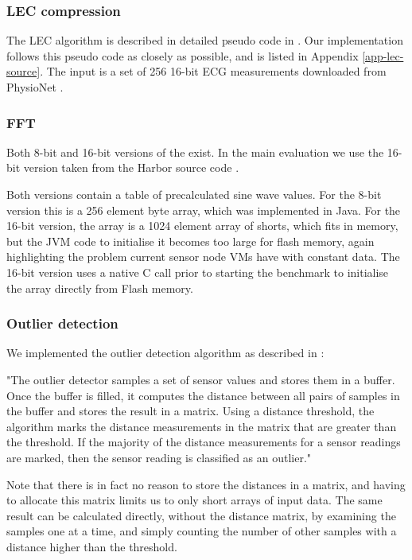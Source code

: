 \subsubsection{LEC compression}
The LEC algorithm is described in detailed pseudo code in \cite{Marcelloni:2009ja}. Our implementation follows this pseudo code as closely as possible, and is listed in Appendix \ref{app-lec-source}. The input is a set of 256 16-bit ECG measurements downloaded from PhysioNet \cite{physionet-ecg-data}.


\subsubsection{FFT}
Both 8-bit and 16-bit versions of the  exist. In the main evaluation we use the 16-bit version taken from the Harbor source code \cite{sos-operating-system}.

Both versions contain a table of precalculated sine wave values. For the 8-bit version this is a 256 element byte array, which was implemented in Java. For the 16-bit version, the array is a 1024 element array of shorts, which fits in memory, but the JVM code to initialise it becomes too large for flash memory, again highlighting the problem current sensor node VMs have with constant data. The 16-bit version uses a native C call prior to starting the benchmark to initialise the array directly from Flash memory.

\subsubsection{Outlier detection}
We implemented the outlier detection algorithm as described in \cite{Kumar:2007ge}:

\begin{displayquote}
"The outlier detector samples a set of sensor values and stores them in a buffer. Once the buffer is filled, it computes the distance between all pairs of samples in the buffer and stores the result in a matrix. Using a distance threshold, the algorithm marks the distance measurements in the matrix that are greater than the threshold. If the majority of the distance measurements for a sensor readings are marked, then the sensor reading is classified as an outlier."
\end{displayquote}

Note that there is in fact no reason to store the distances in a matrix, and having to allocate this matrix limits us to only short arrays of input data. The same result can be calculated directly, without the distance matrix, by examining the samples one at a time, and simply counting the number of other samples with a distance higher than the threshold.

